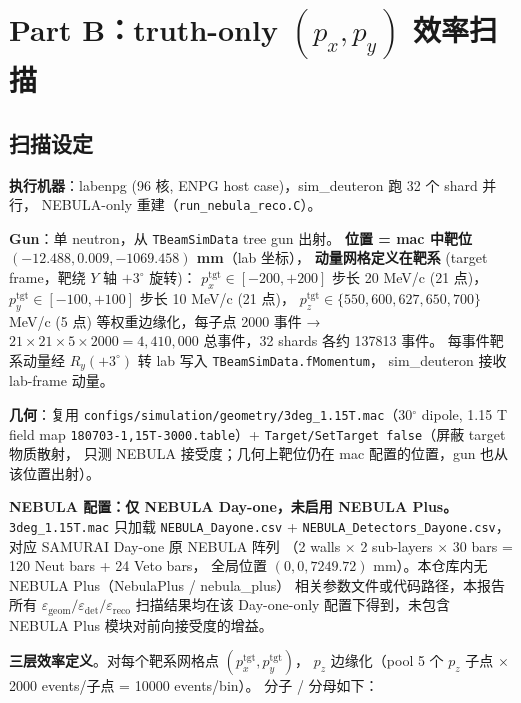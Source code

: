 \documentclass[a4paper,11pt]{ctexart}
\begin{document}
\section{Part B：truth-only $(p_x, p_y)$ 效率扫描}

\subsection{扫描设定}

\textbf{执行机器}：labenpg (96 核, ENPG host case)，sim\_deuteron 跑 32 个 shard 并行，
NEBULA-only 重建（\texttt{run\_nebula\_reco.C}）。

\textbf{Gun}：单 neutron，从 \texttt{TBeamSimData} tree gun 出射。
\textbf{位置 = mac 中靶位 $(-12.488, 0.009, -1069.458)$ mm}（lab 坐标），
\textbf{动量网格定义在靶系} (target frame，靶绕 $Y$ 轴 $+3^\circ$ 旋转)：
$p_x^\mathrm{tgt} \in [-200, +200]$ 步长 20 MeV/c (21 点)，$p_y^\mathrm{tgt} \in [-100, +100]$ 步长 10 MeV/c (21 点)，
$p_z^\mathrm{tgt} \in \{550, 600, 627, 650, 700\}$ MeV/c (5 点) 等权重边缘化，每子点 2000 事件 →
$21 \times 21 \times 5 \times 2000 = 4{,}410{,}000$ 总事件，32 shards 各约 137813 事件。
每事件靶系动量经 $R_y(+3^\circ)$ 转 lab 写入 \texttt{TBeamSimData.fMomentum}，
sim\_deuteron 接收 lab-frame 动量。

\textbf{几何}：复用 \texttt{configs/simulation/geometry/3deg\_1.15T.mac}（30$^\circ$ dipole, 1.15 T
field map \texttt{180703-1,15T-3000.table}）+ \texttt{Target/SetTarget false}（屏蔽 target 物质散射，
只测 NEBULA 接受度；几何上靶位仍在 mac 配置的位置，gun 也从该位置出射）。

\textbf{NEBULA 配置：仅 NEBULA Day-one，未启用 NEBULA Plus。}
\texttt{3deg\_1.15T.mac} 只加载 \texttt{NEBULA\_Dayone.csv} +
\texttt{NEBULA\_Detectors\_Dayone.csv}，对应 SAMURAI Day-one 原 NEBULA 阵列
（2 walls $\times$ 2 sub-layers $\times$ 30 bars = 120 Neut bars + 24 Veto bars，
全局位置 $(0, 0, 7249.72)$ mm）。本仓库内无 NEBULA Plus（NebulaPlus / nebula\_plus）
相关参数文件或代码路径，本报告所有 $\varepsilon_\mathrm{geom}/\varepsilon_\mathrm{det}/\varepsilon_\mathrm{reco}$
扫描结果均在该 Day-one-only 配置下得到，未包含 NEBULA Plus 模块对前向接受度的增益。

\textbf{三层效率定义}。对每个靶系网格点 $(p_x^\mathrm{tgt}, p_y^\mathrm{tgt})$，
$p_z$ 边缘化（pool 5 个 $p_z$ 子点 $\times$ 2000 events/子点 = 10000 events/bin）。
分子 / 分母如下：
\end{document}
